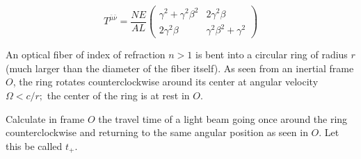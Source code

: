 \documentclass[11pt,largemargins]{homework}
\begin{document}
\begin{alphaparts}
\begin{equation}
T^{\bar{\mu} \bar{\nu}} = \frac{NE}{AL} \begin{pmatrix} \gamma^2 + \gamma^2 \beta^2 & 2 \gamma^2 \beta \\ 2 \gamma^2 \beta & \gamma^2 \beta^2 + \gamma^2 \end{pmatrix}
\end{equation}
\end{alphaparts}

\question An optical fiber of index of refraction $n > 1$ is bent into a circular ring of radius $r$ (much larger than the diameter of the fiber itself).  As seen from an inertial frame $O$, the ring rotates counterclockwise around its center at angular velocity $\Omega < c/r;$ the center of the ring is at rest in $O$.

\begin{alphaparts}
\questionpart
Calculate in frame $O$ the travel time of a light beam going once around the ring counterclockwise and returning to the same angular position as seen in $O$.  Let this be called $t_{+}$. 

\end{alphaparts}	
\setcounter{questionCounter}{10}
\end{document}
